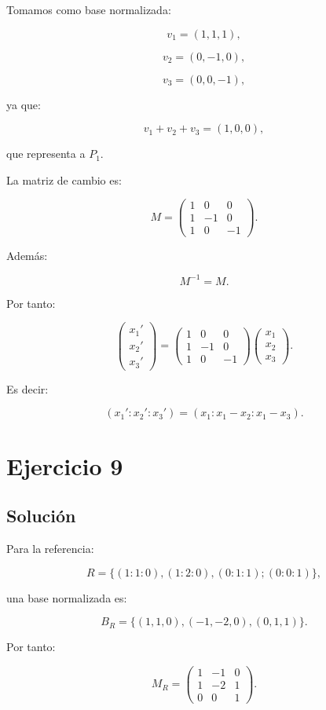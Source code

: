 \documentclass[11pt,a4paper]{article}
\begin{document}
Tomamos como base normalizada:

\[
v_1=(1,1,1),
\]

\[
v_2=(0,-1,0),
\]

\[
v_3=(0,0,-1),
\]

ya que:

\[
v_1+v_2+v_3=(1,0,0),
\]

que representa a \(P_1\).

La matriz de cambio es:

\[
M=
\begin{pmatrix}
1&0&0\\
1&-1&0\\
1&0&-1
\end{pmatrix}.
\]

Además:

\[
M^{-1}=M.
\]

Por tanto:

\[
\boxed{
\begin{pmatrix}
x_1'\\x_2'\\x_3'
\end{pmatrix}
=
\begin{pmatrix}
1&0&0\\
1&-1&0\\
1&0&-1
\end{pmatrix}
\begin{pmatrix}
x_1\\x_2\\x_3
\end{pmatrix}.
}
\]

Es decir:

\[
\boxed{
(x_1':x_2':x_3')
=
(x_1:x_1-x_2:x_1-x_3).
}
\]

\section{Ejercicio 9}
\subsection{Solución}

Para la referencia:

\[
R=
\{(1:1:0),(1:2:0),(0:1:1);(0:0:1)\},
\]

una base normalizada es:

\[
B_R=
\{(1,1,0),(-1,-2,0),(0,1,1)\}.
\]

Por tanto:

\[
M_R=
\begin{pmatrix}
1&-1&0\\
1&-2&1\\
0&0&1
\end{pmatrix}.
\]
\end{document}

